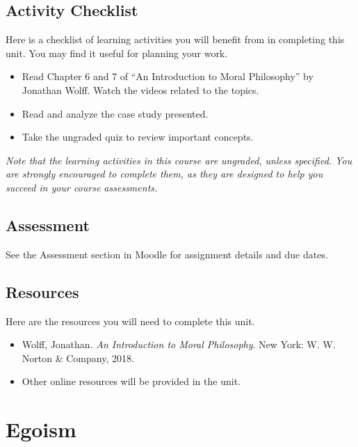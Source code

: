 \documentclass[
]{book}
\providecommand{\tightlist}{%
  \setlength{\itemsep}{0pt}\setlength{\parskip}{0pt}}
\begin{document}
\hypertarget{activity-checklist-1}{%
\subsection*{Activity Checklist}\label{activity-checklist-1}}

Here is a checklist of learning activities you will benefit from in completing this unit. You may find it useful for planning your work.

\begin{itemize}
\tightlist
\item
  Read Chapter 6 and 7 of ``An Introduction to Moral Philosophy'' by Jonathan Wolff. Watch the videos related to the topics.
\item
  Read and analyze the case study presented.
\item
  Take the ungraded quiz to review important concepts.
\end{itemize}

\emph{Note that the learning activities in this course are ungraded, unless specified. You are strongly encouraged to complete them, as they are designed to help you succeed in your course assessments.}

\hypertarget{assessment-2}{%
\subsection*{Assessment}\label{assessment-2}}

See the Assessment section in Moodle for assignment details and due dates.

\hypertarget{resources-1}{%
\subsection*{Resources}\label{resources-1}}

Here are the resources you will need to complete this unit.

\begin{itemize}
\tightlist
\item
  Wolff, Jonathan. \emph{An Introduction to Moral Philosophy}. New York: W. W. Norton \& Company, 2018.
\item
  Other online resources will be provided in the unit.
\end{itemize}

\hypertarget{egoism}{%
\section{Egoism}\label{egoism}}
\end{document}
